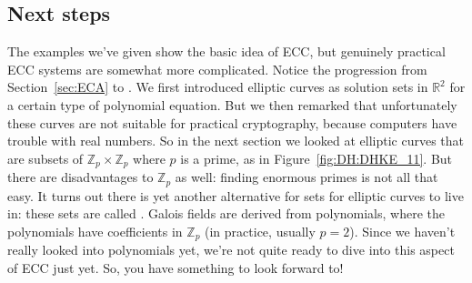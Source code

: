 \subsection{Next steps}
The examples we've given show the basic idea of ECC, but genuinely practical ECC systems are somewhat more complicated. Notice the progression from Section~\ref{sec:ECA} to \label{sec:ECA2}. We first introduced elliptic curves as solution sets in $\mathbb{R}^2$ for a certain type of polynomial equation. But we then remarked that unfortunately these curves are not suitable for practical cryptography, because computers have trouble with real numbers. So in the next section we looked at elliptic curves that are subsets of $\mathbb{Z}_p \times \mathbb{Z}_p$ where $p$ is a prime, as in Figure~\ref{fig:DH:DHKE_11}. But there are disadvantages to $\mathbb{Z}_p$ as well: finding enormous primes is not all that easy. It turns out there is yet another alternative for sets for elliptic curves to live in:  these sets are called . Galois fields are derived from polynomials, where the polynomials have coefficients in $\mathbb{Z}_p$ (in practice, usually $p=2$).  Since we haven't really looked into polynomials yet, we're not quite ready to dive into this aspect of ECC just yet.  So, you have something to look forward to! 

